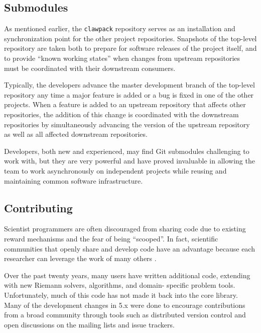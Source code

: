 \subsection{Submodules}

As mentioned earlier, the \texttt{clawpack} repository serves as an
installation and synchronization point for the other project repositories.
Snapshots of the top-level repository are taken both to prepare for
software releases of the \clawpack project itself, and to provide
``known working states'' when changes from upstream repositories must
be coordinated with their downstream consumers.

Typically, the \clawpack developers advance the master development
branch of the top-level repository any time a major feature is added
or a bug is fixed in one of the other projects.  When a feature is
added to an upstream repository that affects other repositories, the
addition of this change is coordinated with the downstream
repositories by simultaneously advancing the version of the upstream
repository as well as all affected downstream repositories.

Developers, both new and experienced, may find Git submodules challenging
to work with, but they are very powerful and
have proved invaluable in allowing the \clawpack team to
work asynchronously on independent projects while reusing and maintaining
common software infrastructure.


\subsection{Contributing}

Scientist programmers are often discouraged from sharing code
due to existing reward mechanisms and the fear of being ``scooped''.
In fact, scientific communities that openly share and develop code
have an advantage because each researcher can leverage the work of
many others \cite{Turk:2013hd}.

Over the past twenty years, many users have written additional
code, extending \clawpack with new Riemann solvers, algorithms, and domain-
specific problem tools.  Unfortunately, much of this code has not 
made it back into the core
library.  Many of the development changes in \clawpack 5.x were done
to encourage contributions from a broad community through tools such as
distributed version control and open discussions on the mailing lists and issue
trackers. 

